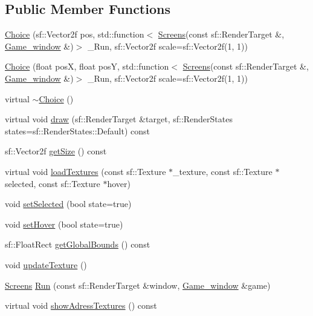 \subsection*{Public Member Functions}
\begin{DoxyCompactItemize}
\item 
\hyperlink{class_choice_a0ce837a0b3bc6b119b06163482fba415}{Choice} (sf\+::\+Vector2f pos, std\+::function$<$ \hyperlink{_globals_8h_a3d5776bab98402b03be09156bacf4f68}{Screens}(const sf\+::\+Render\+Target \&, \hyperlink{class_game__window}{Game\+\_\+window} \&)$>$ \+\_\+\+Run, sf\+::\+Vector2f scale=sf\+::\+Vector2f(1, 1))
\item 
\hyperlink{class_choice_afc2877f32cc760f96f33d0a12a0c0911}{Choice} (float posX, float posY, std\+::function$<$ \hyperlink{_globals_8h_a3d5776bab98402b03be09156bacf4f68}{Screens}(const sf\+::\+Render\+Target \&, \hyperlink{class_game__window}{Game\+\_\+window} \&)$>$ \+\_\+\+Run, sf\+::\+Vector2f scale=sf\+::\+Vector2f(1, 1))
\item 
virtual \hyperlink{class_choice_ac60418c9d38713ccef3cb0dd1f14a083}{$\sim$\+Choice} ()
\item 
virtual void \hyperlink{class_choice_ad6a03ce8c892eacabef3691feba37b0f}{draw} (sf\+::\+Render\+Target \&target, sf\+::\+Render\+States states=sf\+::\+Render\+States\+::\+Default) const
\item 
sf\+::\+Vector2f \hyperlink{class_choice_ad013aa52558a29430889b9c6e9c0a1ab}{get\+Size} () const
\item 
virtual void \hyperlink{class_choice_a70d994feb4c3215eb477bae3df7c5052}{load\+Textures} (const sf\+::\+Texture $\ast$\+\_\+texture, const sf\+::\+Texture $\ast$selected, const sf\+::\+Texture $\ast$hover)
\item 
void \hyperlink{class_choice_aa4bbe520ca9f933327fc1f678d6626f8}{set\+Selected} (bool state=true)
\item 
void \hyperlink{class_choice_a377e5d456c5c7c7e8914af52cf184a3a}{set\+Hover} (bool state=true)
\item 
sf\+::\+Float\+Rect \hyperlink{class_choice_a8b901a892c521edcdb02c49c5bd057a8}{get\+Global\+Bounds} () const
\item 
void \hyperlink{class_choice_aa3113d895017610a03fff73795cf22fd}{update\+Texture} ()
\item 
\hyperlink{_globals_8h_a3d5776bab98402b03be09156bacf4f68}{Screens} \hyperlink{class_choice_aafd399c5b27102d38871a2a886eecd70}{Run} (const sf\+::\+Render\+Target \&window, \hyperlink{class_game__window}{Game\+\_\+window} \&game)
\item 
virtual void \hyperlink{class_choice_ad29163ceee43a59dba6ea46452ca46c0}{show\+Adress\+Textures} () const
\end{DoxyCompactItemize}



